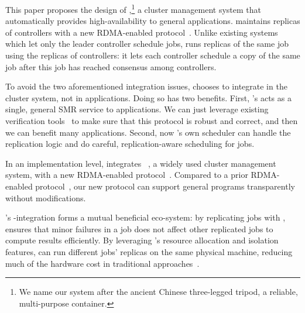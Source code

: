 
This paper proposes the design of \xxx,\footnote{We name our system after the 
ancient Chinese three-legged tripod, a reliable, multi-purpose container.} a 
cluster management system that automatically provides high-availability to 
general applications. \xxx maintains replicas of controllers with a new 
RDMA-enabled \paxos protocol~\cite{falcon:github}. Unlike existing systems which 
let only the leader controller schedule jobs, \xxx runs replicas of the same job 
using the replicas of controllers: it lets each controller schedule a copy of 
the same job after this job has reached consensus among controllers. 

To avoid the two aforementioned integration issues, \xxx chooses to integrate 
\paxos in the cluster system, not in applications. Doing so has two benefits. 
First, \xxx's \paxos acts as a single, general SMR service to applications. We 
can just leverage existing verification 
tools~\cite{modist:nsdi09,demeter:sosp11} to make sure that this \paxos 
protocol is robust and correct, and then we can benefit many applications. 
Second, now \xxx's own scheduler can handle the replication logic and do 
careful, replication-aware scheduling for jobs.


In an implementation level, \xxx integrates \mesos~\cite{mesos:nsdi11}, a widely 
used cluster management system, with a new RDMA-enabled \paxos 
protocol~\cite{falcon:github}. Compared to a prior RDMA-enabled \paxos 
protocol~\cite{dare:hpdc15}, our new protocol can support general programs 
transparently without modifications.

\xxx's \mesos-\paxos integration forms a mutual beneficial 
eco-system: by replicating jobs with \paxos, 
\xxx ensures that minor failures in a job does not affect other replicated 
jobs to compute results efficiently. By leveraging \mesos's resource allocation 
and isolation features, \xxx can run different jobs' replicas on the same 
physical machine, reducing much of the hardware cost in traditional 
\paxos approaches~\cite{crane:sosp15,rex:eurosys14}.

